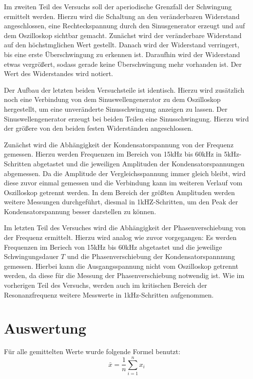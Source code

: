 Im zweiten Teil des Versuchs soll der aperiodische Grenzfall der Schwingung ermittelt werden. Hierzu wird die Schaltung
an den veränderbaren Widerstand angeschlossen, eine Rechteckspannung durch den Sinusgenerator erzeugt und auf dem
Oszilloskop sichtbar gemacht. Zunächst wird der veränderbare Widerstand auf den höchstmglichen Wert gestellt. Danach
wird der Widerstand verringert, bis eine erste Überschwingung zu erkennen ist. Daraufhin wird der Widerstand
etwas vergrößert, sodass gerade keine Überschwingung mehr vorhanden ist. Der Wert des Widerstandes wird notiert.

Der Aufbau der letzten beiden Versuchsteile ist identisch. Hierzu wird zusätzlich noch eine Verbindung von dem Sinuswellengenerator
zu dem Oszilloskop hergestellt, um eine unveränderte Sinusschwingung anzeigen zu lassen. Der Sinuswellengenerator erzeugt
bei beiden Teilen eine Sinusschwingung. Hierzu wird der größere von den beiden festen Widerständen angeschlossen.

Zunächst wird die Abhängigkeit der Kondensatorspannung von der Frequenz gemessen. Hierzu werden Frequenzen im Bereich
von 15kHz bis 60kHz in 5kHz-Schritten abgetastet und die jeweiligen Amplituden der Kondensatorspannungen abgemessen.
Da die Amplitude der Vergleichsspannung immer gleich bleibt, wird diese zuvor einmal gemessen und die Verbindung
kann im weiteren Verlauf vom Oszilloskop getrennt werden.
In dem Bereich der größten Amplituden werden weitere Messungen durchgeführt, diesmal in 1kHZ-Schritten, um den Peak
der Kondensatorspannung besser darstellen zu können.

Im letzten Teil des Versuches wird die Abhängigkeit der Phasenverschiebung von der Frequenz ermittelt.
Hierzu wird analog wie zuvor vorgegangen: Es werden Frequenzen im Beriech von 15kHz bis 60kHz abgetastet und die jeweilige
Schwingungsdauer $T$ und die Phasenverschiebung der Kondensatorspannnung gemessen. Hierbei kann die Ausgangsspannung nicht
vom Oszilloskop getrennt werden, da diese für die Messung der Phasenverschiebung notwendig ist. Wie im vorherigen Teil
des Versuchs, werden auch im kritischen Bereich der Resonanzfrequenz weitere Messwerte in 1kHz-Schritten aufgenommen.

\section{Auswertung}
Für alle gemittelten Werte wurde folgende Formel benutzt:
\begin{equation}
  \bar{x} = \frac{1}{n}\sum\limits_{i=1}^n x_{i}
\end{equation}

